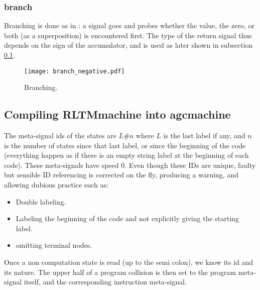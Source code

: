 \subsubsection{branch}

Branching is done as in : a signal goes and probes whether the value, the zero, or both (as a superposition) is encountered first.
The type of the return signal thus depends on the sign of the accumulator, and is used as later shown in subsection \ref{subsec:Compiling}.
\begin{figure}[hbt]
	\centering
	\small%
	\texttt{[image: branch\_negative.pdf]}%
	\caption{Branching.}
	\label{fig:branch:neg}
\end{figure}



\subsection{Compiling RLTMmachine into agc\RLTM machine}
\label{subsec:Compiling}
The meta-signal ids of the states are 
$L\#n$
where $L$ is the last label if any, and $n$ is the number of states since that last label, or since the beginning of the code (everything happen as if there is an empty string label at the beginning of each code).
These meta-signals have speed $0$.
Even though these IDs are unique, faulty but sensible ID referencing is corrected on the fly, producing a warning, and allowing dubious practice such as:
\begin{itemize}
	\item Double labeling.
	\item Labeling the beginning of the code and not explicitly giving the starting label.
	\item omitting terminal nodes.
\end{itemize}

Once a non computation state is read (up to the semi colon), we know its id and its nature.
The upper half of a program collision is then set to the program meta-signal itself, and the corresponding instruction meta-signal.

